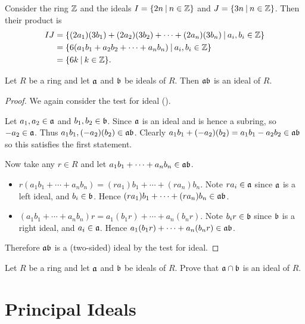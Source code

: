 \begin{example}
    Consider the ring $\mathbb{Z}$ and the ideals $I = \{2n \vert n \in \Z\}$ and $J = \{3n \vert n \in \Z\}$. Then their product is
    \begin{align*}
        IJ &= \{(2a_1)(3b_1) + (2a_2)(3b_2) + \cdots + (2a_n)(3b_n) \vert a_i,b_i \in \Z\}\\
        &= \{6(a_1b_1 + a_2b_2 + \cdots + a_nb_n) \vert a_i,b_i \in \Z\}\\
        &= \{6k \vert k \in \Z\}.
    \end{align*}
\end{example}
\begin{proposition}
    Let $R$ be a ring and let $\mathfrak{a}$ and $\mathfrak{b}$ be ideals of $R$. Then $\mathfrak{ab}$ is an ideal of $R$.
\end{proposition}
\begin{proof}
    We again consider the test for ideal ().

    Let $a_1,a_2 \in \mathfrak{a}$ and $b_1,b_2 \in \mathfrak{b}$. Since $\mathfrak{a}$ is an ideal and is hence a subring, so $-a_2 \in \mathfrak{a}$. Thus $a_1b_1, (-a_2)(b_2) \in \mathfrak{ab}$. Clearly $a_1b_1 + (-a_2)(b_2) = a_1b_1 - a_2b_2 \in \mathfrak{ab}$ so this satisfies the first statement.

    Now take any $r \in R$ and let $a_1b_1 + \cdots + a_nb_n \in \mathfrak{ab}$.
    \begin{itemize}
        \item $r(a_1b_1 + \cdots + a_nb_n) = (ra_1)b_1 + \cdots + (ra_n)b_n$. Note $ra_i \in \mathfrak{a}$ since $\mathfrak{a}$ is a left ideal, and $b_i \in \mathfrak{b}$. Hence $(ra_1)b_1 + \cdots + (ra_n)b_n \in \mathfrak{ab}$.
        \item $(a_1b_1 + \cdots + a_nb_n)r = a_1(b_1r) + \cdots + a_n(b_nr)$. Note $b_ir \in \mathfrak{b}$ since $\mathfrak{b}$ is a right ideal, and $a_i \in \mathfrak{a}$. Hence $a_1(b_1r) + \cdots + a_n(b_nr) \in \mathfrak{ab}$.
    \end{itemize}

    Therefore $\mathfrak{ab}$ is a (two-sided) ideal by the test for ideal.
\end{proof}

\begin{exercise}
    Let $R$ be a ring and let $\mathfrak{a}$ and $\mathfrak{b}$ be ideals of $R$. Prove that $\mathfrak{a} \cap \mathfrak{b}$ is an ideal of $R$.
\end{exercise}

\section{Principal Ideals}
